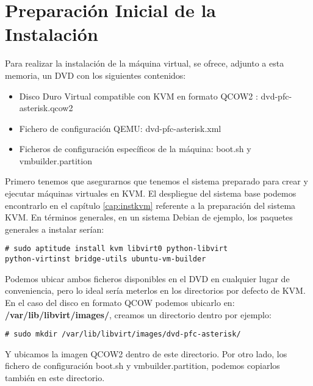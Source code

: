 
\section*{Preparación Inicial de la Instalación}

Para realizar la instalación de la máquina virtual, se ofrece, adjunto a esta memoria, un DVD con los siguientes contenidos:

\begin{itemize}
	\item Disco Duro Virtual compatible con KVM en formato QCOW2 \cite{website:qcow2}: dvd-pfc-asterisk.qcow2
	\item Fichero de configuración QEMU: dvd-pfc-asterisk.xml
	\item Ficheros de configuración específicos de la máquina: boot.sh y vmbuilder.partition
\end{itemize}

Primero tenemos que asegurarnos que tenemos el sistema preparado para crear y ejecutar máquinas virtuales en KVM. El despliegue del sistema base podemos encontrarlo en el capítulo \ref{cap:instkvm} referente a la preparación del sistema KVM. En términos generales, en un sistema Debian de ejemplo, los paquetes generales a instalar serían:

\begin{lstlisting}[style=consola]
# sudo aptitude install kvm libvirt0 python-libvirt 
python-virtinst bridge-utils ubuntu-vm-builder
\end{lstlisting}

Podemos ubicar ambos ficheros disponibles en el DVD en cualquier lugar de conveniencia, pero lo ideal sería meterlos en los directorios por defecto de KVM. En el caso del disco en formato QCOW podemos ubicarlo en: \textbf{/var/lib/libvirt/images/}, creamos un directorio dentro por ejemplo:

\begin{lstlisting}[style=consola]
# sudo mkdir /var/lib/libvirt/images/dvd-pfc-asterisk/
\end{lstlisting}

Y ubicamos la imagen QCOW2 dentro de este directorio. Por otro lado, los fichero de configuración boot.sh y vmbuilder.partition, podemos copiarlos también en este directorio. 

